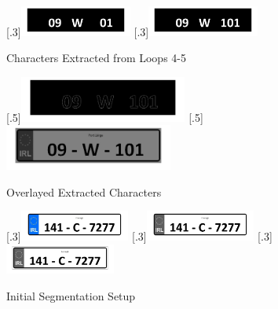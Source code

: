 \documentclass[a4paper]{article}
\begin{document}
	\begin{figure}[H]
		\centering
		[.3\linewidth]{\includegraphics[height=1cm]{Results/Q2/NumPlate3/qanumber_plate_3Added4.jpg}}%
		[.3\linewidth]{\includegraphics[height=1cm]{Results/Q2/NumPlate3/qanumber_plate_3Added5.jpg}}%
		\caption{Characters Extracted from Loops 4-5}
		\label{fig:}
	\end{figure}
	\begin{figure}[H]
		\centering
		[.5\linewidth]{\includegraphics[height=1.5cm]{Results/Q2/NumPlate3/qanumber_plate_3Canny.jpg}}%
		[.5\linewidth]{\includegraphics[height=1.5cm]{Results/Q2/NumPlate3/qanumber_plate_3Overlay.jpg}}%
		\caption{Overlayed Extracted Characters}
		\label{fig:}
	\end{figure}
	\begin{figure}[H]
		\centering
		[.3\linewidth]{\includegraphics[height=1cm]{Results/Q2/NumPlate4/qanumber_plate_4.jpg}}%
		[.3\linewidth]{\includegraphics[height=1cm]{Results/Q2/NumPlate4/qanumber_plate_4Grey.jpg}}%
		[.3\linewidth]{\includegraphics[height=1cm]{Results/Q2/NumPlate4/qanumber_plate_4Low.jpg}}%
		\caption{Initial Segmentation Setup}
		\label{fig:}
	\end{figure}
\end{document}
